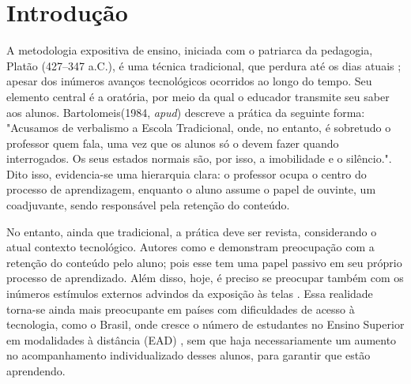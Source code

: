\chapter{Introdução}
\label{sec:introducao}

A metodologia expositiva de ensino, iniciada com o patriarca da pedagogia, Platão (427–347 a.C.), é uma técnica tradicional, que perdura até os dias atuais \cite{andreataAulaExpositivaPaulo2019}; apesar dos inúmeros avanços tecnológicos ocorridos ao longo do tempo. Seu elemento central é a oratória, por meio da qual o educador transmite seu saber aos alunos. Bartolomeis(1984, \textit{apud}) \cite{andreataAulaExpositivaPaulo2019} descreve a prática da seguinte forma: "Acusamos de verbalismo a Escola Tradicional, onde, no entanto, é  sobretudo o professor quem fala, uma vez que os alunos só o devem  fazer quando interrogados. Os seus estados normais são, por isso, a imobilidade e o silêncio.". Dito isso, evidencia-se uma hierarquia clara: o professor ocupa o centro do processo de aprendizagem, enquanto o aluno assume o papel de ouvinte, um coadjuvante, sendo responsável pela retenção do conteúdo.

No entanto, ainda que tradicional, a prática deve ser revista, considerando o atual contexto tecnológico. Autores como \cite{andreataAulaExpositivaPaulo2019} e \cite{pereiraCriticaMetodologiaTradicional2022} demonstram preocupação com a retenção do conteúdo pelo aluno; pois esse tem uma papel passivo em seu próprio processo de aprendizado. Além disso, hoje, é preciso se preocupar também com os inúmeros estímulos externos advindos da exposição às telas \cite{lopesUsoCelularEm2017}. Essa realidade torna-se ainda mais preocupante em países com dificuldades de acesso à tecnologia, como o Brasil, onde cresce o número de estudantes no Ensino Superior em modalidades à distância (EAD) \cite{moranEnsinoSuperiorDistancia2009}, sem que haja necessariamente um aumento no acompanhamento individualizado desses alunos, para garantir que estão aprendendo.





% 
% 